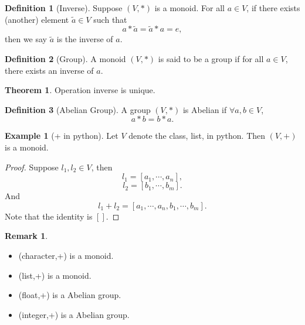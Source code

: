 \documentclass[12pt]{book}
\theoremstyle{definition}
\newtheorem{definition}{Definition}[chapter]
\newtheorem{example}{Example}[chapter]
\newtheorem{theorem}{Theorem}[chapter]
\newtheorem{remark}{Remark}
\begin{document}
\begin{definition}[Inverse]
Suppose $(V,*)$ is a monoid. For all $a \in V$, if there exists (another) element $\tilde a\in V$ such that 
$$
a*\tilde a = \tilde a *a =e,
$$
then we say $\tilde a $ is the inverse of $a$.
\end{definition}

\begin{definition}[Group]
A monoid $(V,*)$ is said to be  a group if for all $a \in V$, there exists an inverse of $a$.
\end{definition}

\begin{theorem}
Operation inverse is unique.	
\end{theorem}

\begin{definition}[Abelian Group]
A group $(V,*)$ is Abelian if $\forall a,b \in V$,
$$
a*b=b*a.
$$
	
\end{definition}


\begin{example}[+ in python]
Let $V$ denote the class, list, in python. Then $(V,+)$ is a monoid.  
\end{example}
\begin{proof}
	Suppose $l_1,l_2 \in V$, then
$$
l_1 = [a_1,\cdots,a_n],
$$
$$
l_2 = [b_1,\cdots,b_m].
$$
And
$$
l_1 + l_2 = [a_1,\cdots,a_n,b_1,\cdots,b_m].
$$
Note that the identity is $[]$.
\end{proof}

\begin{remark}\
\begin{itemize}
	\item (character,+) is a monoid.
	\item (list,+) is a monoid.
	\item (float,+) is a Abelian group.
	\item (integer,+) is a Abelian group.
\end{itemize}
\end{remark}
\end{document}

